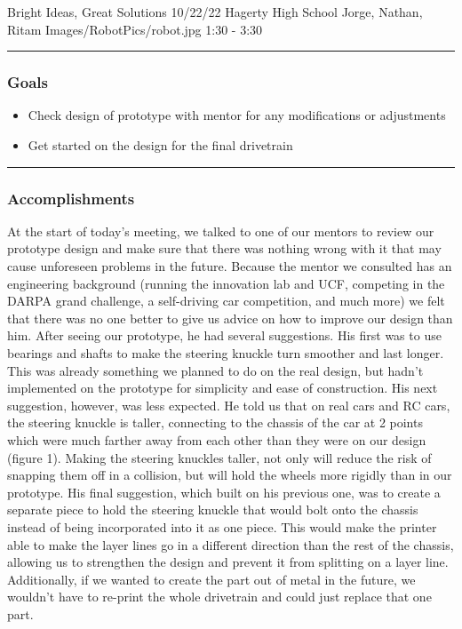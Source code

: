 \insertmeeting 
	{Bright Ideas, Great Solutions} 
	{10/22/22} 
	{Hagerty High School}
	{Jorge, Nathan, Ritam}
	{Images/RobotPics/robot.jpg}
	{1:30 - 3:30}
	
\noindent\hfil\rule{\textwidth}{.4pt}\hfil
\subsubsection*{Goals}
\begin{itemize}
    \item Check design of prototype with mentor for any modifications or adjustments
    \item Get started on the design for the final drivetrain


\end{itemize} 

\noindent\hfil\rule{\textwidth}{.4pt}\hfil

\subsubsection*{Accomplishments}
At the start of today’s meeting, we talked to one of our mentors to review our prototype design and make sure that there was nothing wrong with it that may cause unforeseen problems in the future. Because the mentor we consulted has an engineering background (running the innovation lab and UCF, competing in the DARPA grand challenge, a self-driving car competition, and much more) we felt that there was no one better to give us advice on how to improve our design than him. After seeing our prototype, he had several suggestions. His first was to use bearings and shafts to make the steering knuckle turn smoother and last longer. This was already something we planned to do on the real design, but hadn’t implemented on the prototype for simplicity and ease of construction. His next suggestion, however, was less expected. He told us that on real cars and RC cars, the steering knuckle is taller, connecting to the chassis of the car at 2 points which were much farther away from each other than they were on our design (figure 1). Making the steering knuckles taller, not only will reduce the risk of snapping them off in a collision, but will hold the wheels more rigidly than in our prototype. His final suggestion, which built on his previous one, was to create a separate piece to hold the steering knuckle that would bolt onto the chassis instead of being incorporated into it as one piece. This would make the printer able to make the layer lines go in a different direction than the rest of the chassis, allowing us to strengthen the design and prevent it from splitting on a layer line. Additionally, if we wanted to create the part out of metal in the future, we wouldn’t have to re-print the whole drivetrain and could just replace that one part.

